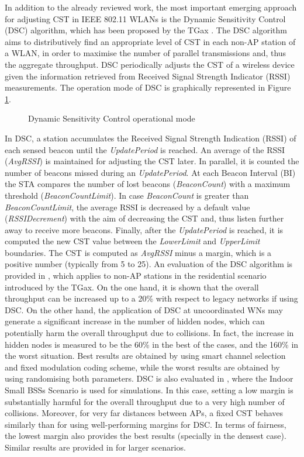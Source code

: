\documentclass[12pt, a4paper,twoside]{tesi_upf}
\begin{document}
		
			In addition to the already reviewed work, the most important emerging approach for adjusting CST in IEEE 802.11 WLANs is the Dynamic Sensitivity Control (DSC) algorithm, which has been proposed by the TGax \cite{smith2015dynamic}. The DSC algorithm aims to distributively find an appropriate level of CST in each non-AP station of a WLAN, in order to maximise the number of parallel transmissions and, thus the aggregate throughput. DSC periodically adjusts the CST of a wireless device given the information retrieved from Received Signal Strength Indicator (RSSI) measurements. The operation mode of DSC is graphically represented in Figure \ref{fig:dsc_flowchart}.				
			\begin{figure}[t!]
				\centering
				\caption{Dynamic Sensitivity Control operational mode}
				\label{fig:dsc_flowchart}
			\end{figure}
		
			In DSC, a station accumulates the Received Signal Strength Indication (RSSI) of  each  sensed  beacon until the \textit{UpdatePeriod} is reached. An average of the RSSI (\textit{AvgRSSI}) is maintained for adjusting the CST later. In parallel, it is counted the number of beacons missed during an \textit{UpdatePeriod}. At each Beacon Interval (BI) the STA compares the number of lost beacons (\textit{BeaconCount}) with a maximum threshold (\textit{BeaconCountLimit}). In case \textit{BeaconCount} is greater than \textit{BeaconCountLimit}, the average RSSI is decreased by a default value (\textit{RSSIDecrement}) with the aim of decreasing the CST and, thus listen further away to receive more beacons. Finally, after the \textit{UpdatePeriod} is reached, it is computed the new CST value between the \textit{LowerLimit} and \textit{UpperLimit} boundaries. The CST is computed as \textit{AvgRSSI} minus a margin, which is a positive number (typically from 5 to 25). An evaluation of the DSC algorithm is provided in \cite{afaqui2015evaluation}, which applies to non-AP stations in the residential scenario introduced by the TGax. On the one hand, it is shown that the overall throughput can be increased up to a 20\% with respect to legacy networks if using DSC. On the other hand, the application of DSC at uncoordinated WNs may generate a significant increase in the number of hidden nodes, which can potentially harm the overall throughput due to collisions. In fact, the increase in hidden nodes is measured to be the 60\% in the best of the cases, and the 160\% in the worst situation. Best results are obtained by using smart channel selection and fixed modulation coding scheme, while the worst results are obtained by using randomising both parameters. DSC is also evaluated in \cite{zhong2016promise}, where the Indoor Small BSSs Scenario is used for simulations. In this case, setting a low margin is substantially harmful for the overall throughput due to a very high number of collisions. Moreover, for very far distances between APs, a fixed CST behaves similarly than for using well-performing margins for DSC. In terms of fairness, the lowest margin also provides the best results (specially in the densest case). Similar results are provided in \cite{selinis2016evaluation, kulkarni2015taming} for larger scenarios.
			
\end{document}
